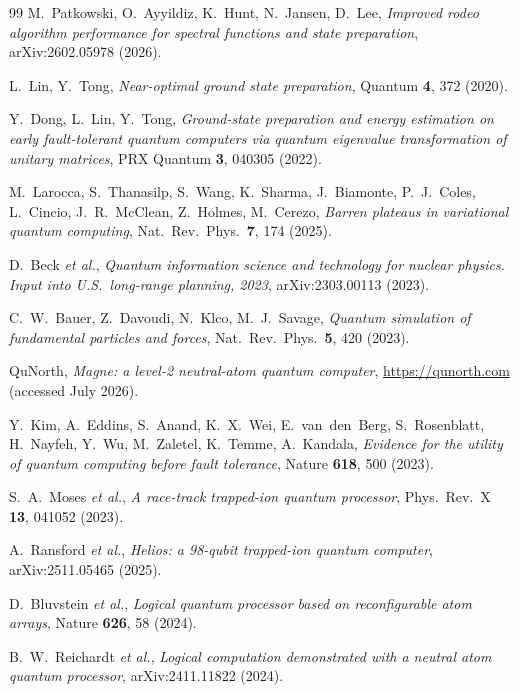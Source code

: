 \documentclass[
  aps,            %
  prc,            %
  reprint,        %
  superscriptaddress,
  floatfix,
  nofootinbib
]{revtex4-2}
\begin{document}
\begin{thebibliography}{99}
M.~Patkowski, O.~Ayyildiz, K.~Hunt, N.~Jansen, D.~Lee,
\textit{Improved rodeo algorithm performance for spectral functions and state
preparation},
arXiv:2602.05978 (2026).

L.~Lin, Y.~Tong,
\textit{Near-optimal ground state preparation},
Quantum \textbf{4}, 372 (2020).

Y.~Dong, L.~Lin, Y.~Tong,
\textit{Ground-state preparation and energy estimation on early fault-tolerant
quantum computers via quantum eigenvalue transformation of unitary matrices},
PRX Quantum \textbf{3}, 040305 (2022).

M.~Larocca, S.~Thanasilp, S.~Wang, K.~Sharma, J.~Biamonte, P.~J.~Coles,
L.~Cincio, J.~R.~McClean, Z.~Holmes, M.~Cerezo,
\textit{Barren plateaus in variational quantum computing},
Nat.\ Rev.\ Phys.\ \textbf{7}, 174 (2025).

D.~Beck \textit{et al.},
\textit{Quantum information science and technology for nuclear physics.
Input into U.S.\ long-range planning, 2023},
arXiv:2303.00113 (2023).

C.~W.~Bauer, Z.~Davoudi, N.~Klco, M.~J.~Savage,
\textit{Quantum simulation of fundamental particles and forces},
Nat.\ Rev.\ Phys.\ \textbf{5}, 420 (2023).

QuNorth, \textit{Magne: a level-2 neutral-atom quantum computer},
\url{https://qunorth.com} (accessed July 2026).

Y.~Kim, A.~Eddins, S.~Anand, K.~X.~Wei, E.~van~den~Berg, S.~Rosenblatt,
H.~Nayfeh, Y.~Wu, M.~Zaletel, K.~Temme, A.~Kandala,
\textit{Evidence for the utility of quantum computing before fault tolerance},
Nature \textbf{618}, 500 (2023).

S.~A.~Moses \textit{et al.},
\textit{A race-track trapped-ion quantum processor},
Phys.\ Rev.\ X \textbf{13}, 041052 (2023).

A.~Ransford \textit{et al.},
\textit{Helios: a 98-qubit trapped-ion quantum computer},
arXiv:2511.05465 (2025).

D.~Bluvstein \textit{et al.},
\textit{Logical quantum processor based on reconfigurable atom arrays},
Nature \textbf{626}, 58 (2024).

B.~W.~Reichardt \textit{et al.},
\textit{Logical computation demonstrated with a neutral atom quantum processor},
arXiv:2411.11822 (2024).
\end{thebibliography}
\end{document}
